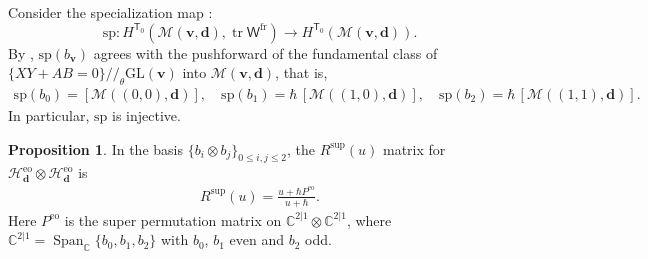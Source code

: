 \documentclass[10pt]{amsart}
\theoremstyle{definition}
\newtheorem{Proposition}[Theorem]{Proposition}
\numberwithin{equation}{section}
\newcommand{\GL}{\mathrm{GL}}
\newcommand{\bC}{\mathbb{C}}
\newcommand{\bv}{\mathbf{v}}
\newcommand{\bd}{\mathbf{d}}
\newcommand{\cH}{\mathcal{H}}
\newcommand{\cM}{\mathcal{M}}
\newcommand{\sT}{\mathsf{T}}
\newcommand{\sW}{\mathsf{W}}
\newcommand{\Span}{\operatorname{Span}}
\newcommand{\tr}{\operatorname{tr}}
\begin{document}
Consider the specialization map \cite[Def.~7.14]{COZZ}: 
$$\mathrm{sp}\colon H^{\sT_0}(\cM(\bv,\bd),\tr \sW^{\mathrm{fr}})\to H^{\sT_0}(\cM(\bv,\bd)). $$ 
By \cite[Rem.~7.16]{COZZ}, $\mathrm{sp}(b_\bv)$ agrees with the pushforward of the fundamental class of $\{XY+AB=0\}/\!\!/_\theta \GL(\bv)$ into $\cM(\bv,\bd)$, that is,
\begin{align*}
\mathrm{sp}(b_0)=[\cM((0,0),\bd)],\quad \mathrm{sp}(b_1)=\hbar\,[\cM((1,0),\bd)],\quad \mathrm{sp}(b_2)=\hbar\,[\cM((1,1),\bd)].
\end{align*}
In particular, $\mathrm{sp}$ is injective.

\begin{Proposition}\label{prop gl(2|1) even-odd}
In the basis $\{b_i\otimes b_j\}_{0\leqslant i,j\leqslant 2}$, the $R^{\mathrm{sup}}(u)$ matrix for $\cH^{\mathrm{eo}}_{\bd}\otimes \cH^{\mathrm{eo}}_{\bd}$ is
\begin{align*}
R^{\mathrm{sup}}(u)=\frac{u+\hbar P^{\mathrm{eo}}}{u+\hbar}.
\end{align*}
Here $P^{\mathrm{eo}}$ is the super permutation matrix on $\bC^{2|1}\otimes \bC^{2|1}$, where $\bC^{2|1}=\Span_\bC\{b_0,b_1,b_2\}$ with $b_0$, $b_1$ even and $b_2$ odd.
\end{Proposition}
\end{document}
